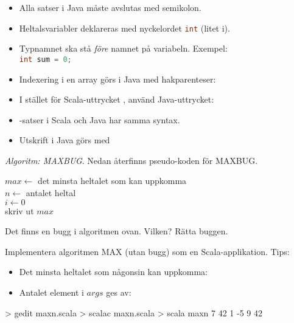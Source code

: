 \begin{itemize}[noitemsep, nolistsep]
\item Alla satser i Java måste avslutas med semikolon.
\item Heltalsvariabler deklareras med nyckelordet \lstinline[language=Java]{int} (litet i). 
\item Typnamnet ska stå \emph{före} namnet på variabeln. Exempel: \\ \lstinline[language=Java]{int sum = 0;}
\item Indexering i en array görs i Java med hakparenteser: 
\item I stället för Scala-uttrycket , använd Java-uttrycket: \\ 
\item {}-satser i Scala och Java har samma syntax.
\item Utskrift i Java görs med 
\end{itemize}


\Task \emph{Algoritm: MAXBUG}. Nedan återfinns pseudo-koden för MAXBUG. 

\begin{algorithm}[H]
 
 $max \leftarrow$ det minsta heltalet som kan uppkomma  \\
 $n \leftarrow $ antalet heltal \\
 $i \leftarrow 0$ \\
 skriv ut $max$
\end{algorithm}

\Subtask\Pen Det finns en bugg i algoritmen ovan. Vilken? Rätta buggen.

\Subtask Implementera algoritmen MAX (utan bugg) som en Scala-applikation. Tips:
\begin{itemize}[noitemsep, nolistsep]
\item Det minsta heltalet som någonsin kan uppkomma: 
\item Antalet element i $args$ ges av: 
\end{itemize}

\begin{REPL}
> gedit maxn.scala
> scalac maxn.scala
> scala maxn 7 42 1 -5 9
42
\end{REPL}

